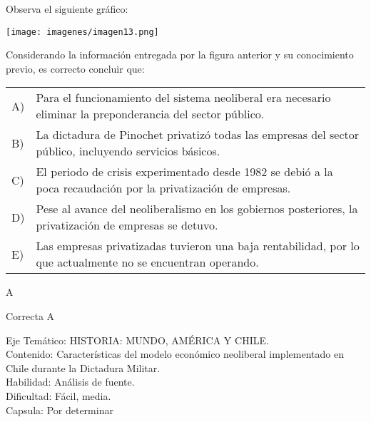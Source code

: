 \documentclass[letterpaper,11pt]{article}
\newcommand{\anchopregunta}{0.9\textwidth}
\begin{document}
\begin{enumerate}
\begin{minipage}{\anchopregunta}
\item Observa el siguiente gráfico:
\begin{center}
\texttt{[image: imagenes/imagen13.png]}
\end{center}
Considerando la información entregada por la figura anterior y su conocimiento previo, es correcto concluir que:
\begin{flushleft}\begin{tabular}{@{\hspace{-.001\textwidth}}l@{\hspace{2pt}}p{}}
A)& Para el funcionamiento del sistema neoliberal era necesario eliminar la preponderancia del sector público.\\
B)& La dictadura de Pinochet privatizó todas las empresas del sector público, incluyendo servicios básicos.\\
C)& El periodo de crisis experimentado desde 1982 se debió a la poca recaudación por la privatización de empresas.\\
D)& Pese al avance del neoliberalismo en los gobiernos posteriores, la privatización de empresas se detuvo.\\
E)& Las empresas privatizadas tuvieron una baja rentabilidad, por lo que actualmente no se encuentran operando.\\ 
\end{tabular}\end{flushleft}%
\begin{key} A
\end{key} 
\begin{hint}
\end{hint}
\begin{answer} Correcta A\\
\end{answer}
\begin{info} %
\begin{flushleft}
Eje Temático: HISTORIA: MUNDO, AMÉRICA Y CHILE.\\
Contenido: Características del modelo económico neoliberal implementado en Chile durante la Dictadura Militar.\\
Habilidad: Análisis de fuente.\\
Dificultad: Fácil, media.\\
Capsula: Por determinar \\
\end{flushleft} 
\end{info}
\end{minipage}\vfill$\;$ %


\end{enumerate}
\end{document}
